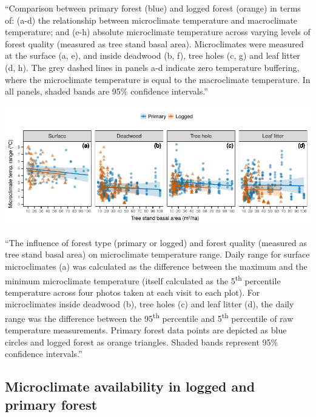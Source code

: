 \documentclass[12pt,a4paper,]{report}
\theoremstyle{definition}
\theoremstyle{definition}
\theoremstyle{definition}
\theoremstyle{remark}
\begin{document}
``Comparison between primary forest (blue) and logged forest (orange) in
terms of: (a-d) the relationship between microclimate temperature and
macroclimate temperature; and (e-h) absolute microclimate temperature
across varying levels of forest quality (measured as tree stand basal
area). Microclimates were measured at the surface (a, e), and inside
deadwood (b, f), tree holes (c, g) and leaf litter (d, h). The grey
dashed lines in panels a-d indicate zero temperature buffering, where
the microclimate temperature is equal to the macroclimate temperature.
In all panels, shaded bands are 95\% confidence intervals.''

\begin{center}\includegraphics{./output/fig-4-4-1} \end{center}

``The influence of forest type (primary or logged) and forest quality
(measured as tree stand basal area) on microclimate temperature range.
Daily range for surface microclimates (a) was calculated as the
difference between the maximum and the minimum microclimate temperature
(itself calculated as the 5\textsuperscript{th} percentile temperature
across four photos taken at each visit to each plot). For microclimates
inside deadwood (b), tree holes (c) and leaf litter (d), the daily range
was the difference between the 95\textsuperscript{th} percentile and
5\textsuperscript{th} percentile of raw temperature measurements.
Primary forest data points are depicted as blue circles and logged
forest as orange triangles. Shaded bands represent 95\% confidence
intervals.''

\subsection{Microclimate availability in logged and primary
forest}\label{microclimate-availability-in-logged-and-primary-forest}
\end{document}
